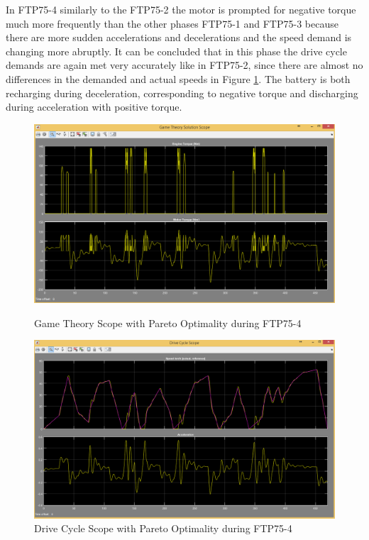 In FTP75-4 similarly to the FTP75-2 the motor is prompted for negative torque much more frequently than the other phases FTP75-1 and FTP75-3 because there are more sudden accelerations and decelerations and the speed demand is changing more abruptly. It can be concluded that in this phase the drive cycle demands are again met very accurately like in FTP75-2, since there are almost no differences in the demanded and actual speeds in Figure \ref{fig:dcpo4}. The battery is both recharging during deceleration, corresponding to negative torque and discharging during acceleration with positive torque.

\begin{figure}[hp]
\centering
\includegraphics[scale=0.45]{figures/Pareto/FTP75-4/gameTheory05Juli}
\caption{Game Theory Scope with Pareto Optimality during FTP75-4}
\label{fig:gtpo4}
\includegraphics[scale=0.41]{figures/Pareto/FTP75-4/driveCycle05Juli}
\caption{Drive Cycle Scope with Pareto Optimality during FTP75-4}
\label{fig:dcpo4}
\end{figure}

